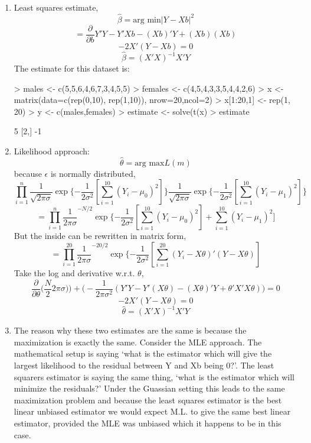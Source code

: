 \documentclass{article}
\begin{document}
\begin{enumerate}
\item Least squares estimate, 
$$ \hat{\beta} = \text{arg min}  |Y - Xb|^2 $$
$$ = \frac{\partial}{\partial b} Y'Y -Y'Xb - (Xb)'Y + (Xb)(Xb)  $$
$$  -2X' (Y - Xb) = 0 $$
$$ \hat{\beta} = (X'X)^{-1} X'Y $$
The estimate for this dataset is:
\begin{Schunk}
\begin{Sinput}
> males <- c(5,5,6,4,6,7,3,4,5,5)
> females <- c(4,5,4,3,3,5,4,4,2,6)
> x <- matrix(data=c(rep(0,10), rep(1,10)), nrow=20,ncol=2)
> x[1:20,1] <- rep(1, 20)
> y <- c(males,females)
> estimate <- solve(t(x)%*%x) %*% (t(x) %*%y)
> estimate
\end{Sinput}
\begin{Soutput}
     [,1]
[1,]    5
[2,]   -1
\end{Soutput}
\end{Schunk}
\item Likelihood approach:
$$ \hat{\theta} = \text{arg max} L(m) $$
because $ \epsilon $ is normally distributed, 
$$ \prod_{i=1}^n \frac{1}{\sqrt{2\pi\sigma}} \exp \{ -\frac{1}{2 \sigma^2}[\sum_{i=1}^{10} (Y_i - \mu_0)^2] \} \frac{1}{\sqrt{2\pi\sigma}} \exp \{ -\frac{1}{2\sigma^2}[\sum_{i=1}^{10} (Y_i - \mu_1)^2] \}  $$
$$ = \prod_{i=1}^n \frac{1}{2\pi\sigma}^{-N/2}  \exp \{ -\frac{1}{2\sigma^2}[\sum_{i=1}^{10} (Y_i - \mu_0)^2] +  \sum_{i=1}^{10} (Y_i - \mu_1)^2] $$
But the inside can be rewritten in matrix form, 
$$ 
= \prod_{i=1}^{20} \frac{1}{2\pi\sigma}^{-20/2}  \exp \{ -\frac{1}{2\sigma^2}[\sum_{i=1}^{20}(Y_i - X\theta)'(Y - X\theta)] 
$$
Take the log and derivative w.r.t. $ \theta $, 
$$
\frac{\partial}{\partial \theta} \Big(\frac{N}{2} 2\pi\sigma)\Big)  + \Big(-\frac{1}{2\pi\sigma^2}(Y'Y - Y'(X\theta) - (X\theta)'Y + \theta'X'X\theta) \Big) = 0 
$$
$$
 - 2X'(Y  - X\theta)  = 0 
$$
$$
\hat{\theta} = (X'X)^{-1} X'Y
$$
\item The reason why these two estimates are the same is because the maximization is exactly the same. Consider the MLE approach. The mathematical setup is saying `what is the estimator which will give the largest likelihood to the residual between Y and Xb being 0?'. The least squarers estimator is saying the same thing, `what is the estimator which will minimize the residuals?' Under the Guassian setting this leads to the same maximization problem and because the least squares estimator is the best linear unbiased estimator we would expect M.L. to give the same best linear estimator, provided the MLE was unbiased which it happens to be in this case. 
\end{enumerate}
\end{document}
